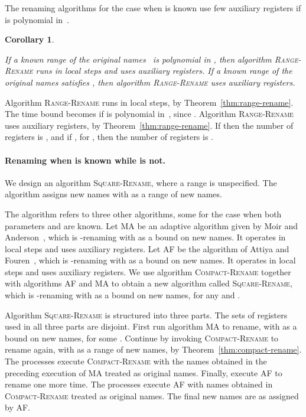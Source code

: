 \documentclass[11pt]{article}
\newcommand{\BBB}{\vspace*{-\bigskipamount}}
\newcommand{\Paragraph}[1]{\BBB\paragraph{#1}}
\newcommand{\qed}{\hfill  \smallbreak}
\newenvironment{proof}{\noindent{\bf Proof:}}{\qed}
\newtheorem{corollary}{Corollary}
\begin{document}
The renaming algorithms for the case when  is known use few auxiliary registers if  is   polynomial in~.




\begin{corollary}
\label{cor:only-known-N-rename}

If a known range of the original names~ is polynomial in , then algorithm   \textsc{Range-Rename} runs in  local steps and uses  auxiliary registers. 
If a known range of the original names  satisfies , then algorithm  \textsc{Range-Rename} uses   auxiliary registers. 
\end{corollary}

\begin{proof}
Algorithm \textsc{Range-Rename} runs in  local steps, by Theorem~\ref{thm:range-rename}.
The time bound becomes  if  is polynomial in~, since .
Algorithm \textsc{Range-Rename} uses  auxiliary registers, by Theorem~\ref{thm:range-rename}.
If  then the number of registers is , and if , for , then the number of registers is .
\end{proof}




\Paragraph{Renaming when  is known while  is not.}


We design an algorithm \textsc{Square-Rename}, where a range  is unspecified.
The algorithm assigns new names with  as a range of new names.

The algorithm refers to three other algorithms, some for the case when both parameters  and  are known.
Let \textsc{MA} be an adaptive algorithm given by Moir and Anderson~\cite{MoirA95}, which is -renaming with  as a  bound on new names.
It operates in  local steps and uses  auxiliary registers.
Let \textsc{AF} be the algorithm of Attiya and Fouren~\cite{AttiyaF01}, which is -renaming with  as a bound on new names.
It operates in  local steps and uses  auxiliary registers.
We use algorithm \textsc{Compact-Rename} together with algorithms \textsc{AF} and \textsc{MA} to obtain a new algorithm called \textsc{Square-Rename}, which is -renaming with  as a bound on new names, for any  and .


Algorithm \textsc{Square-Rename} is structured into three parts.
The sets of registers used in all three parts are disjoint.
First run algorithm \textsc{MA} to rename, with  as a  bound on new names, for some .
Continue by invoking \textsc{Compact-Rename} to rename again, with  as a  range of new names, by Theorem~\ref{thm:compact-rename}.
The processes execute \textsc{Compact-Rename} with the names obtained in the preceding execution of \textsc{MA} treated as original names. 
Finally, execute \textsc{AF} to rename one more time.
The processes execute \textsc{AF} with names obtained in \textsc{Compact-Rename} treated as original names. 
The final new names are as assigned by \textsc{AF}.
\end{document}
